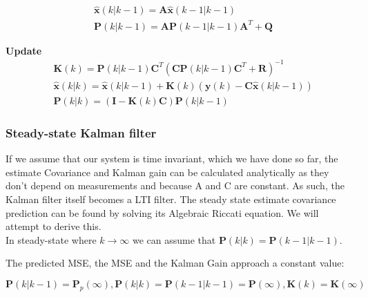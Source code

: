 \begin{align}
	&\hat{\textbf{x}}	(k|k-1) = \textbf{A} \hat{\textbf{x}}	(k-1|k-1) 		\label{eq:Kalman_pred_state_compact} 	\\
	&\textbf{P}			(k|k-1) = \textbf{A}\textbf{P}			(k-1|k-1)\textbf{A}^T+\textbf{Q} 				\label{eq:Kalman_pred_cov_compact} 		
\end{align}

\textbf{Update}
\begin{align}
	&\textbf{K}			(k) 		= \textbf{P}				(k|k-1)\textbf{C}^T(\textbf{C}\textbf{P}	(k|k-1)	\textbf{C}^T + \textbf{R})^{-1}										\label{eq:Kalman_upd_kalman_gain_compact} \\
	&\hat{\textbf{x}}	(k|k) 	= \hat{\textbf{x}}			(k|k-1) + \textbf{K}						(k)	(\textbf{y}		(k) - \textbf{C}\hat{\textbf{x}}		(k|k-1)) 	\label{eq:Kalman_upd_est_state_compact} \\
	&\textbf{P}			(k|k) 	= (\textbf{I} - \textbf{K}	(k)\textbf{C})\textbf{P}					(k|k-1)																		\label{eq:Kalman_upd_est_cov_compact}
\end{align}


\subsubsection{Steady-state Kalman filter}
If we assume that our system is time invariant, which we have done so far, the estimate Covariance and Kalman gain can be calculated analytically as they don't depend on measurements and because A and C are constant. As such, the Kalman filter itself becomes a LTI filter. The steady state estimate covariance prediction can be found by solving its Algebraic Riccati equation. We will attempt to derive this.\\


In steady-state where $k \rightarrow \infty$ we can assume that $\textbf{P}(k|k) = \textbf{P}(k-1|k-1) $. 

The predicted MSE, the MSE and the Kalman Gain approach a constant value:

\begin{equation}
	\textbf{P}(k|k-1) =  \textbf{P}_p(\infty), \textbf{P}(k|k) = \textbf{P}(k-1|k-1) = \textbf{P}(\infty), \textbf{K}(k) = \textbf{K}(\infty)
\end{equation}

